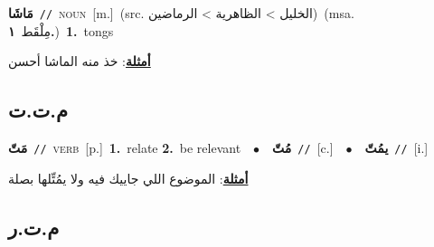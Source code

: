 \documentclass[10pt,a4paper,twoside]{article} %
\begin{document}
\begin{multicols}{2}
{\setlength\topsep{0pt}\textbf{\foreignlanguage{arabic}{مَاشَا}}\ {\color{gray}\texttt{//}\color{black}}\ \textsc{noun}\ [m.]\ (src. \color{gray}\foreignlanguage{arabic}{الخليل > الظاهرية > الرماضين}\color{black})\ \color{gray}(msa. \foreignlanguage{arabic}{مِلْقَط}~\foreignlanguage{arabic}{\textbf{١.}})\color{black}\ \textbf{1.}~tongs\  \begin{flushright}\color{gray}\foreignlanguage{arabic}{\textbf{\underline{\foreignlanguage{arabic}{أمثلة}}}: خذ منه الماشا أحسن}\end{flushright}\color{black}} \vspace{2mm}

\vspace{-3mm}
\subsection*{\color{blue}\foreignlanguage{arabic}{م.ت.ت}\color{blue}{}} 

{\setlength\topsep{0pt}\textbf{\foreignlanguage{arabic}{مَتّ}}\ {\color{gray}\texttt{//}\color{black}}\ \textsc{verb}\ [p.]\ \textbf{1.}~relate  \textbf{2.}~be relevant\ \ $\bullet$\ \ \setlength\topsep{0pt}\textbf{\foreignlanguage{arabic}{مُتّ}}\ {\color{gray}\texttt{//}\color{black}}\ [c.]\ \ $\bullet$\ \ \setlength\topsep{0pt}\textbf{\foreignlanguage{arabic}{يمُتّ}}\ {\color{gray}\texttt{//}\color{black}}\ [i.]\  \begin{flushright}\color{gray}\foreignlanguage{arabic}{\textbf{\underline{\foreignlanguage{arabic}{أمثلة}}}: الموضوع اللي جاييك فيه ولا يمُتِّلها بصلة}\end{flushright}\color{black}} \vspace{2mm}

\vspace{-3mm}
\subsection*{\color{blue}\foreignlanguage{arabic}{م.ت.ر}\color{blue}{}} 


\end{multicols}
\end{document}
